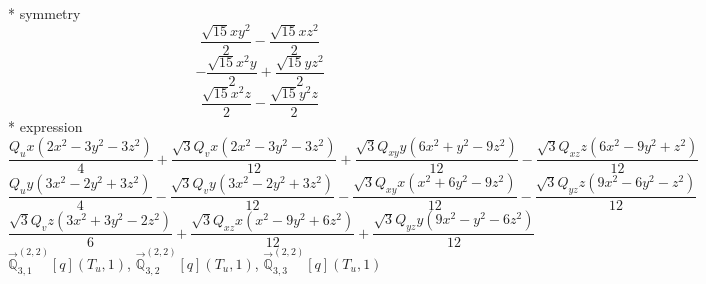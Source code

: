 \documentclass[fleqn,8pt]{jsarticle}
\begin{document}
\noindent\quad ** symmetry
\begin{dmath*}
\frac{\sqrt{15} x y^{2}}{2} - \frac{\sqrt{15} x z^{2}}{2}
\end{dmath*}
\begin{dmath*}
- \frac{\sqrt{15} x^{2} y}{2} + \frac{\sqrt{15} y z^{2}}{2}
\end{dmath*}
\begin{dmath*}
\frac{\sqrt{15} x^{2} z}{2} - \frac{\sqrt{15} y^{2} z}{2}
\end{dmath*}
\noindent\quad ** expression
\begin{dmath*}
\frac{Q_{u} x \left(2 x^{2} - 3 y^{2} - 3 z^{2}\right)}{4} + \frac{\sqrt{3} Q_{v} x \left(2 x^{2} - 3 y^{2} - 3 z^{2}\right)}{12} + \frac{\sqrt{3} Q_{xy} y \left(6 x^{2} + y^{2} - 9 z^{2}\right)}{12} - \frac{\sqrt{3} Q_{xz} z \left(6 x^{2} - 9 y^{2} + z^{2}\right)}{12}
\end{dmath*}
\begin{dmath*}
\frac{Q_{u} y \left(3 x^{2} - 2 y^{2} + 3 z^{2}\right)}{4} - \frac{\sqrt{3} Q_{v} y \left(3 x^{2} - 2 y^{2} + 3 z^{2}\right)}{12} - \frac{\sqrt{3} Q_{xy} x \left(x^{2} + 6 y^{2} - 9 z^{2}\right)}{12} - \frac{\sqrt{3} Q_{yz} z \left(9 x^{2} - 6 y^{2} - z^{2}\right)}{12}
\end{dmath*}
\begin{dmath*}
\frac{\sqrt{3} Q_{v} z \left(3 x^{2} + 3 y^{2} - 2 z^{2}\right)}{6} + \frac{\sqrt{3} Q_{xz} x \left(x^{2} - 9 y^{2} + 6 z^{2}\right)}{12} + \frac{\sqrt{3} Q_{yz} y \left(9 x^{2} - y^{2} - 6 z^{2}\right)}{12}
\end{dmath*}
\noindent\quad $\vec{\mathbb{Q}}_{3,1}^{(2,2)}[q](T_{u},1)$, $\vec{\mathbb{Q}}_{3,2}^{(2,2)}[q](T_{u},1)$, $\vec{\mathbb{Q}}_{3,3}^{(2,2)}[q](T_{u},1)$
\end{document}
